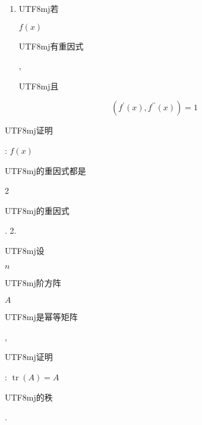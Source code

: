 \documentclass[10pt]{article}
\begin{document}
\begin{enumerate}
  \item \begin{CJK}{UTF8}{mj}若\end{CJK} $f(x)$ \begin{CJK}{UTF8}{mj}有重因式\end{CJK}, \begin{CJK}{UTF8}{mj}且\end{CJK}
\end{enumerate}
$$
\left(f^{\prime}(x), f^{\prime \prime}(x)\right)=1
$$
\begin{CJK}{UTF8}{mj}证明\end{CJK}: $f(x)$ \begin{CJK}{UTF8}{mj}的重因式都是\end{CJK} 2 \begin{CJK}{UTF8}{mj}的重因式\end{CJK}. 2. \begin{CJK}{UTF8}{mj}设\end{CJK} $n$ \begin{CJK}{UTF8}{mj}阶方阵\end{CJK} $A$ \begin{CJK}{UTF8}{mj}是幂等矩阵\end{CJK}, \begin{CJK}{UTF8}{mj}证明\end{CJK}: $\operatorname{tr}(A)=A$ \begin{CJK}{UTF8}{mj}的秩\end{CJK}.
\end{document}
